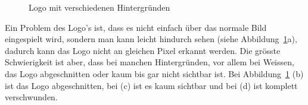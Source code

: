 \documentclass[12pt,a4paper]{report}
\begin{document}
\begin{figure}[h]%
    \centering
    \qquad
    \qquad
    \qquad
    \caption{Logo mit verschiedenen Hintergründen}%
    \label{fig:logo2}%
\end{figure}

Ein Problem des Logo's ist, dass es nicht einfach über das normale Bild eingespielt wird, sondern man kann leicht hindurch sehen (siehe Abbildung~\ref{fig:logo2}a),
dadurch kann das Logo nicht an gleichen Pixel erkannt werden.
Die grösste Schwierigkeit ist aber, dass bei manchen Hintergründen, vor allem bei Weissen, das Logo abgeschnitten oder kaum bis gar nicht sichtbar ist.
Bei Abbildung~\ref{fig:logo2} (b) ist das Logo abgeschnitten, bei (c) ist es kaum sichtbar und bei (d) ist komplett verschwunden.
\end{document}

